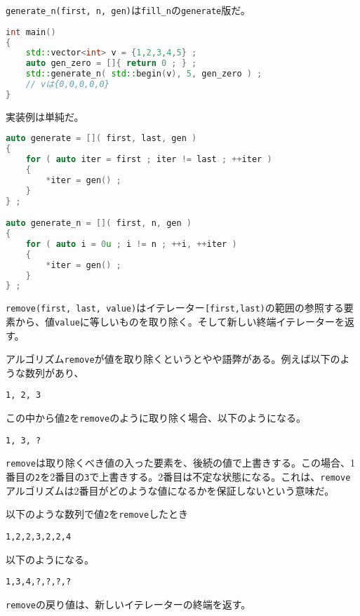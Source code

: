\texttt{generate\_n(first, n, gen)}は\texttt{fill\_n}の\texttt{generate}版だ。

\begin{lstlisting}[language={C++}]
int main()
{
    std::vector<int> v = {1,2,3,4,5} ;
    auto gen_zero = []{ return 0 ; } ;
    std::generate_n( std::begin(v), 5, gen_zero ) ;
    // vは{0,0,0,0,0}
}
\end{lstlisting}

\ifTombow\pagebreak\fi
実装例は単純だ。

\begin{lstlisting}[language={C++}]
auto generate = []( first, last, gen )
{
    for ( auto iter = first ; iter != last ; ++iter )
    {
        *iter = gen() ;
    }
} ;

auto generate_n = []( first, n, gen )
{
    for ( auto i = 0u ; i != n ; ++i, ++iter )
    {
        *iter = gen() ;
    }
} ;
\end{lstlisting}


\texttt{remove(first, last, value)}はイテレーター\texttt{[first,last)}の範囲の参照する要素から、値\texttt{value}に等しいものを取り除く。そして新しい終端イテレーターを返す。

アルゴリズム\texttt{remove}が値を取り除くというとやや語弊がある。例えば以下のような数列があり、
\begin{lstlisting}[style=terminal]
1, 2, 3
\end{lstlisting}
この中から値\texttt{2}を\texttt{remove}のように取り除く場合、以下のようになる。
\begin{lstlisting}[style=terminal]
1, 3, ?
\end{lstlisting}

\texttt{remove}は取り除くべき値の入った要素を、後続の値で上書きする。この場合、1番目の\texttt{2}を2番目の\texttt{3}で上書きする。2番目は不定な状態になる。これは、\texttt{remove}アルゴリズムは2番目がどのような値になるかを保証しないという意味だ。

以下のような数列で値\texttt{2}を\texttt{remove}したとき
\begin{lstlisting}[style=terminal]
1,2,2,3,2,2,4
\end{lstlisting}
以下のようになる。
\begin{lstlisting}[style=terminal]
1,3,4,?,?,?,?
\end{lstlisting}

\texttt{remove}の戻り値は、新しいイテレーターの終端を返す。

